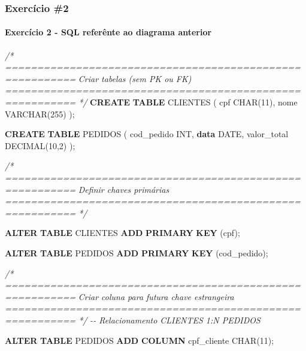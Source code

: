 \documentclass[
]{book}
\newenvironment{Shaded}{\begin{snugshade}}{\end{snugshade}}
\newcommand{\CommentTok}[1]{\textcolor[rgb]{0.56,0.35,0.01}{\textit{#1}}}
\newcommand{\DataTypeTok}[1]{\textcolor[rgb]{0.13,0.29,0.53}{#1}}
\newcommand{\DecValTok}[1]{\textcolor[rgb]{0.00,0.00,0.81}{#1}}
\newcommand{\KeywordTok}[1]{\textcolor[rgb]{0.13,0.29,0.53}{\textbf{#1}}}
\newcommand{\NormalTok}[1]{#1}
\begin{document}
\subsubsection{Exercício \#2}\label{exercuxedcio-2}



\paragraph{Exercício 2 - SQL referênte ao diagrama anterior}\label{exercuxedcio-2---sql-referuxeante-ao-diagrama-anterior}

\begin{Shaded}
\begin{Highlighting}[]
\CommentTok{/* =========================================================}
\CommentTok{   Criar tabelas (sem PK ou FK)}
\CommentTok{   ========================================================= */}
\KeywordTok{CREATE} \KeywordTok{TABLE}\NormalTok{ CLIENTES }
\NormalTok{(}
\NormalTok{    cpf }\DataTypeTok{CHAR}\NormalTok{(}\DecValTok{11}\NormalTok{),}
\NormalTok{    nome }\DataTypeTok{VARCHAR}\NormalTok{(}\DecValTok{255}\NormalTok{)}
\NormalTok{);}

\KeywordTok{CREATE} \KeywordTok{TABLE}\NormalTok{ PEDIDOS }
\NormalTok{(}
\NormalTok{    cod\_pedido }\DataTypeTok{INT}\NormalTok{,}
    \KeywordTok{data} \DataTypeTok{DATE}\NormalTok{,}
\NormalTok{    valor\_total }\DataTypeTok{DECIMAL}\NormalTok{(}\DecValTok{10}\NormalTok{,}\DecValTok{2}\NormalTok{)}
\NormalTok{);}

\CommentTok{/* =========================================================}
\CommentTok{   Definir chaves primárias}
\CommentTok{   ========================================================= */}

\KeywordTok{ALTER} \KeywordTok{TABLE}\NormalTok{ CLIENTES  }\KeywordTok{ADD} \KeywordTok{PRIMARY} \KeywordTok{KEY}\NormalTok{ (cpf);}

\KeywordTok{ALTER} \KeywordTok{TABLE}\NormalTok{ PEDIDOS   }\KeywordTok{ADD} \KeywordTok{PRIMARY} \KeywordTok{KEY}\NormalTok{ (cod\_pedido);}

\CommentTok{/* =========================================================}
\CommentTok{   Criar coluna para futura chave estrangeira}
\CommentTok{   ========================================================= */}
\CommentTok{{-}{-} Relacionamento CLIENTES 1:N PEDIDOS }

\KeywordTok{ALTER} \KeywordTok{TABLE}\NormalTok{ PEDIDOS }\KeywordTok{ADD} \KeywordTok{COLUMN}\NormalTok{ cpf\_cliente }\DataTypeTok{CHAR}\NormalTok{(}\DecValTok{11}\NormalTok{);}


\end{Highlighting}
\end{Shaded}
\end{document}
